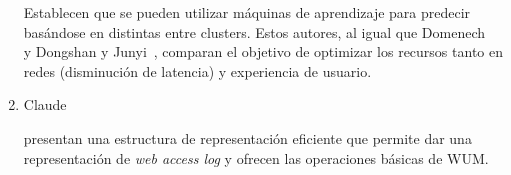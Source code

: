 \begin{enumerate}
	{ 
		
	  Establecen que se pueden utilizar máquinas de aprendizaje para predecir basándose en distintas entre clusters. Estos autores, al igual que Domenech \etal~\cite{Domenech2006} y Dongshan y Junyi~\cite{Dongshan2002}, comparan el objetivo de optimizar los recursos tanto en redes (disminución de latencia) y experiencia de usuario.
	  }
  
  \item Claude \etal~\cite{Claude2014} 
  
	{  
	presentan una estructura de representación eficiente que permite dar una representación de \emph{web access log} y ofrecen las operaciones básicas de WUM.
  }
\end{enumerate}

